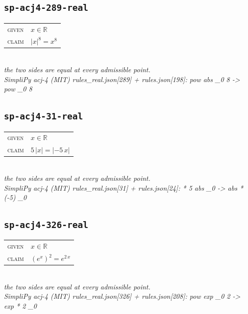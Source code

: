 \documentclass[11pt]{article}
\begin{document}
\subsection*{\texttt{sp-acj4-289-real}}
\begin{tabular}{@{}l@{\quad}l@{}}
\textsc{given} & $x \in \mathbb{R}$ \\[4pt]
\textsc{claim} & $\displaystyle \left|x\right|^{8} = x^{8}$ \\
\end{tabular}\\[2pt]
{\small\emph{the two sides are equal at every admissible point.}}\\
\emph{SimpliPy acj-4 (MIT) rules\_real.json[289] + rules.json[198]: pow abs \_0 8  ->  pow \_0 8}\\

\subsection*{\texttt{sp-acj4-31-real}}
\begin{tabular}{@{}l@{\quad}l@{}}
\textsc{given} & $x \in \mathbb{R}$ \\[4pt]
\textsc{claim} & $\displaystyle 5 \, \left|x\right| = \left|-5 \, x\right|$ \\
\end{tabular}\\[2pt]
{\small\emph{the two sides are equal at every admissible point.}}\\
\emph{SimpliPy acj-4 (MIT) rules\_real.json[31] + rules.json[24]: * 5 abs \_0  ->  abs * (-5) \_0}\\

\subsection*{\texttt{sp-acj4-326-real}}
\begin{tabular}{@{}l@{\quad}l@{}}
\textsc{given} & $x \in \mathbb{R}$ \\[4pt]
\textsc{claim} & $\displaystyle \left(e^{x}\right)^{2} = e^{2 \, x}$ \\
\end{tabular}\\[2pt]
{\small\emph{the two sides are equal at every admissible point.}}\\
\emph{SimpliPy acj-4 (MIT) rules\_real.json[326] + rules.json[208]: pow exp \_0 2  ->  exp * 2 \_0}\\
\end{document}
